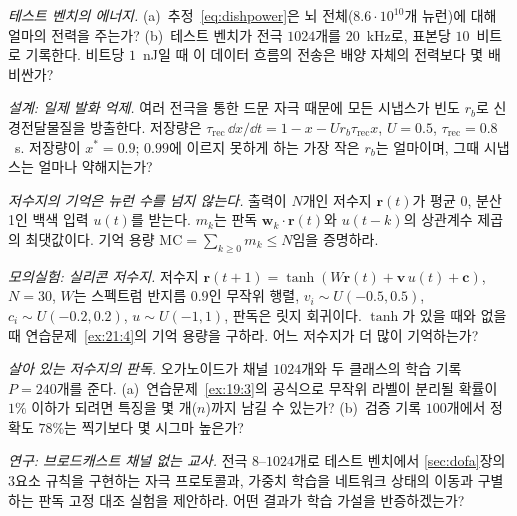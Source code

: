 \begin{exercise}[\lvlA]
\label{ex:21:2}
\emph{테스트 벤치의 에너지.} (a)~추정~\eqref{eq:dishpower}은 뇌 전체($8.6\cdot10^{10}$개 뉴런)에 대해 얼마의 전력을 주는가? (b)~테스트 벤치가 전극 $1024$개를 $20$~kHz로, 표본당 $10$~비트로 기록한다. 비트당 $1$~nJ일 때 이 데이터 흐름의 전송은 배양 자체의 전력보다 몇 배 비싼가?
\end{exercise}

\begin{exercise}[\lvlB]
\label{ex:21:3}
\emph{설계: 일제 발화 억제.} 여러 전극을 통한 드문 자극 때문에 모든 시냅스가 빈도 $r_b$로 신경전달물질을 방출한다. 저장량은 $\tau_{\text{rec}}\,\dd x/\dd t=1-x-Ur_b\tau_{\text{rec}}x$, $U=0.5$, $\tau_{\text{rec}}=0.8$~s. 저장량이 $x^*=0.9$; $0.99$에 이르지 못하게 하는 가장 작은 $r_b$는 얼마이며, 그때 시냅스는 얼마나 약해지는가?
\end{exercise}

\begin{exercise}[\lvlB]
\label{ex:21:4}
\emph{저수지의 기억은 뉴런 수를 넘지 않는다.} 출력이 $N$개인 저수지 $\mathbf r(t)$가 평균 0, 분산 1인 백색 입력 $u(t)$를 받는다. $m_k$는 판독 $\mathbf w_k\cdot\mathbf r(t)$와 $u(t-k)$의 상관계수 제곱의 최댓값이다. 기억 용량 $\mathrm{MC}=\sum_{k\ge0}m_k\le N$임을 증명하라.
\end{exercise}

\begin{exercise}[\lvlB]
\label{ex:21:5}
\emph{모의실험: 실리콘 저수지.} 저수지 $\mathbf r(t+1)=\tanh(W\mathbf r(t)+\mathbf v\,u(t)+\mathbf c)$, $N=30$, $W$는 스펙트럼 반지름 $0.9$인 무작위 행렬, $v_i\sim U(-0.5,0.5)$, $c_i\sim U(-0.2,0.2)$, $u\sim U(-1,1)$, 판독은 릿지 회귀이다. $\tanh$가 있을 때와 없을 때 연습문제~\ref{ex:21:4}의 기억 용량을 구하라. 어느 저수지가 더 많이 기억하는가?
\end{exercise}

\begin{exercise}[\lvlB]
\label{ex:21:6}
\emph{살아 있는 저수지의 판독.} 오가노이드가 채널 $1024$개와 두 클래스의 학습 기록 $P=240$개를 준다. (a)~연습문제~\ref{ex:19:3}의 공식으로 무작위 라벨이 분리될 확률이 $1\%$ 이하가 되려면 특징을 몇 개($n$)까지 남길 수 있는가? (b)~검증 기록 $100$개에서 정확도 $78\%$는 찍기보다 몇 시그마 높은가?
\end{exercise}

\begin{exercise}[\lvlC]
\label{ex:21:7}
\emph{연구: 브로드캐스트 채널 없는 교사.} 전극 $8$--$1024$개로 테스트 벤치에서 \ref{sec:dofa}장의 3요소 규칙을 구현하는 자극 프로토콜과, 가중치 학습을 네트워크 상태의 이동과 구별하는 판독 고정 대조 실험을 제안하라. 어떤 결과가 학습 가설을 반증하겠는가?
\end{exercise}
